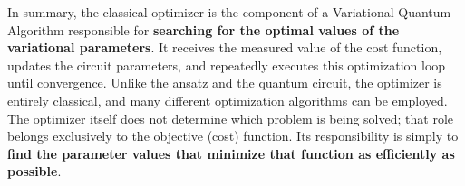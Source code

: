 \highspace
In summary, the classical optimizer is the component of a Variational Quantum Algorithm responsible for \textbf{searching for the optimal values of the variational parameters}. It receives the measured value of the cost function, updates the circuit parameters, and repeatedly executes this optimization loop until convergence. Unlike the ansatz and the quantum circuit, the optimizer is entirely classical, and many different optimization algorithms can be employed. The optimizer itself does not determine which problem is being solved; that role belongs exclusively to the objective (cost) function. Its responsibility is simply to \textbf{find the parameter values that minimize that function as efficiently as possible}.
